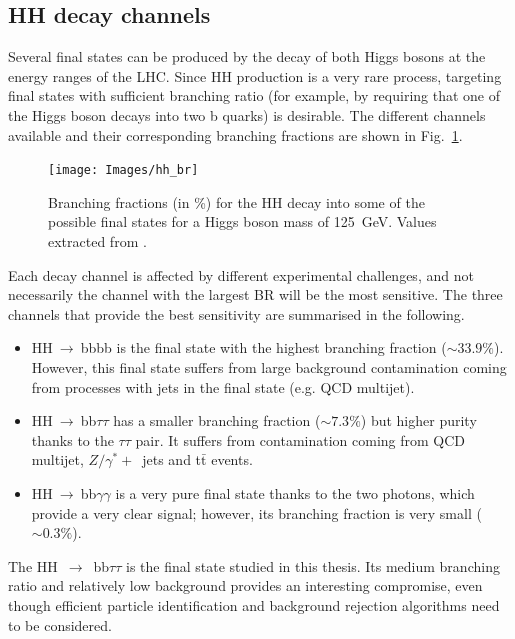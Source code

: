 \documentclass[../main.tex]{subfiles}
\begin{document}
\subsection{HH decay channels}

Several final states can be produced by the decay of both Higgs bosons at the energy ranges of the LHC. Since HH production is a very rare process, targeting final states with sufficient branching ratio (for example, by requiring that one of the Higgs boson decays into two b quarks) is desirable. The different channels available and their corresponding branching fractions are shown in Fig.~\ref{theo:fig:hh_br}.

\begin{figure}[h!]
\begin{center}
\texttt{[image: Images/hh\_br]}
\end{center}
\caption[HH branching fractions]{Branching fractions (in \%) for the HH decay into some of the possible final states for a Higgs boson mass of 125~GeV. Values extracted from \cite{intro:theo:yellow_higgs}.}
\label{theo:fig:hh_br}
\end{figure}

Each decay channel is affected by different experimental challenges, and not necessarily the channel with the largest BR will be the most sensitive. The three channels that provide the best sensitivity are summarised in the following.

\begin{itemize}
\item HH$~\to~$bbbb is the final state with the highest branching fraction ($\sim 33.9\%$). However, this final state suffers from large background contamination coming from processes with jets in the final state (e.g. QCD multijet).
\item HH$~\to~$bb$\tau\tau$ has a smaller branching fraction ($\sim7.3\%$) but higher purity thanks to the $\tau\tau$ pair. It suffers from contamination coming from QCD multijet, $Z/\gamma^*+$~jets and t$\bar{\text{t}}$ events.
\item HH$~\to~$bb$\gamma\gamma$ is a very pure final state thanks to the two photons, which provide a very clear signal; however, its branching fraction is very small ($\sim0.3\%$).
\end{itemize}

The HH~$\to$~bb$\tau\tau$ is the final state studied in this thesis. Its medium branching ratio and relatively low background provides an interesting compromise, even though efficient particle identification and background rejection algorithms need to be considered.
\end{document}
